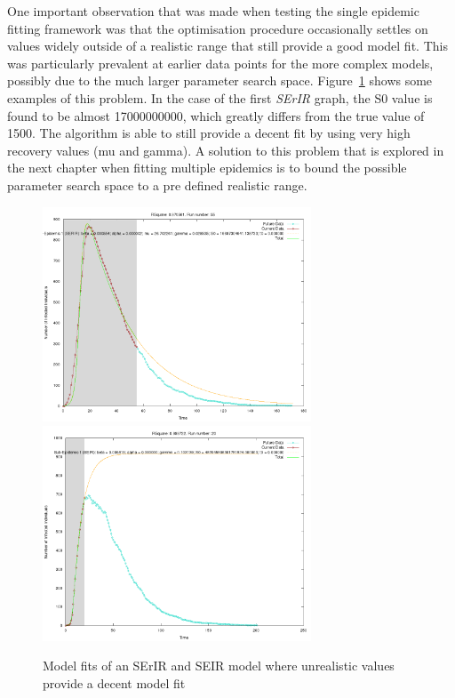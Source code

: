One important observation that was made when testing the single
epidemic fitting framework was that the optimisation procedure
occasionally settles on values widely outside of a realistic range
that still provide a good model fit. This was particularly prevalent
at earlier data points for the more complex models, possibly due to
the much larger parameter search space. Figure~\ref{fig:single3} shows
some examples of this problem. In the case of the first \emph{SErIR}
graph, the S0 value is found to be almost 17000000000, which greatly
differs from the true value of 1500. The algorithm is able to still
provide a decent fit by using very high recovery values (mu and
gamma). A solution to this problem that is explored in the next
chapter when fitting multiple epidemics is to bound the possible
parameter search space to a pre defined realistic range.

\begin{centering}
\begin{figure}[h!]
  \includegraphics[width=8cm]{images/single/bad1.png}
  \includegraphics[width=8cm]{images/single/bad2.png}
  \caption{Model fits of an SErIR and SEIR model where unrealistic
    values provide a decent model fit}
\label{fig:single3}
  \end{figure}
\end{centering}


